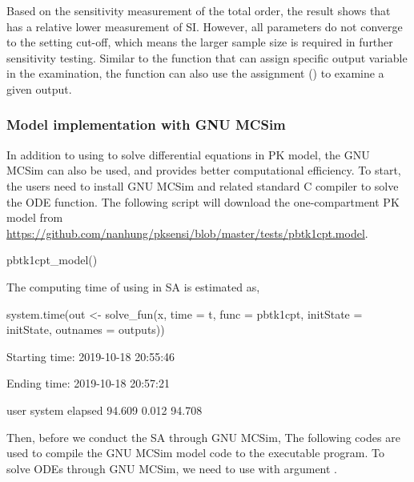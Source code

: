 Based on the sensitivity measurement of the total order, the result
shows that  has a relative lower measurement of SI. However,
all parameters do not converge to the setting cut-off, which means the
larger sample size is required in further sensitivity testing. Similar
to the  function that can assign specific output variable in
the examination, the  function can also use the assignment
() to examine a given output.

\hypertarget{model-implementation-with-gnu-mcsim}{%
\subsubsection{Model implementation with GNU
MCSim}\label{model-implementation-with-gnu-mcsim}}

In addition to using  to solve differential equations
in PK model, the GNU MCSim can also be used, and provides better
computational efficiency. To start, the users need to install GNU MCSim
and related standard C compiler to solve the ODE function. The following
script will download the one-compartment PK model from
\url{https://github.com/nanhung/pksensi/blob/master/tests/pbtk1cpt.model}.

\begin{Schunk}
\begin{Sinput}
pbtk1cpt_model()
\end{Sinput}
\end{Schunk}

The computing time of using  in SA is estimated as,

\begin{Schunk}
\begin{Sinput}
system.time(out <- solve_fun(x, time = t, 
                             func = pbtk1cpt, initState = initState, 
                             outnames = outputs))
\end{Sinput}
\begin{Soutput}
  Starting time: 2019-10-18 20:55:46
\end{Soutput}
\begin{Soutput}
  Ending time: 2019-10-18 20:57:21
\end{Soutput}
\begin{Soutput}
     user  system elapsed 
   94.609   0.012  94.708
\end{Soutput}
\end{Schunk}

Then, before we conduct the SA through GNU MCSim, The following codes
are used to compile the GNU MCSim model code to the executable program.
To solve ODEs through GNU MCSim, we need to use 
with argument .

